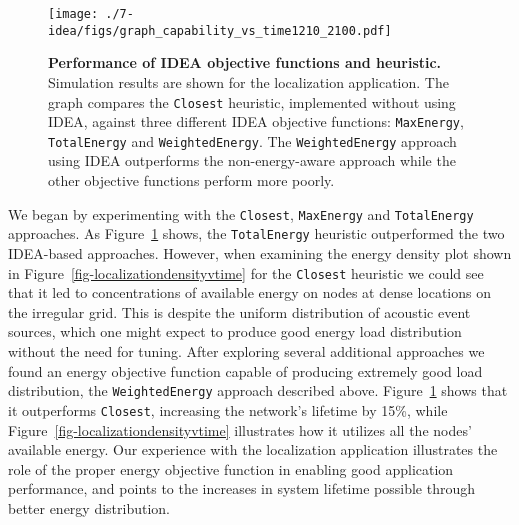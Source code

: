 \begin{figure}[t]
\begin{center}
\texttt{[image: ./7-idea/figs/graph\_capability\_vs\_time1210\_2100.pdf]}
\end{center}
\caption{\small{\textbf{Performance of IDEA objective functions and heuristic.}
Simulation results are shown for the localization application. The graph compares the \texttt{Closest} heuristic, implemented without using
IDEA, against three different IDEA objective functions: \texttt{MaxEnergy},
\texttt{TotalEnergy} and \texttt{WeightedEnergy}. The \texttt{WeightedEnergy}
approach using IDEA outperforms the non-energy-aware approach while the other
objective functions perform more poorly.}}
\label{fig-ideavsheuristics}
\end{figure}

We began by experimenting with the \texttt{Closest}, \texttt{MaxEnergy} and
\texttt{TotalEnergy} approaches. As Figure~\ref{fig-ideavsheuristics} shows,
the \texttt{TotalEnergy} heuristic outperformed the two IDEA-based
approaches.  However, when examining the energy density plot shown in
Figure~\ref{fig-localizationdensityvtime} for the \texttt{Closest} heuristic
we could see that it led to concentrations of available energy on nodes at
dense locations on the irregular grid. This is despite the uniform
distribution of acoustic event sources, which one might expect to produce
good energy load distribution without the need for tuning. After exploring
several additional approaches we found an energy objective function capable
of producing extremely good load distribution, the \texttt{WeightedEnergy}
approach described above. Figure~\ref{fig-ideavsheuristics} shows that it
outperforms \texttt{Closest}, increasing the network's lifetime by 15\%,
while Figure~\ref{fig-localizationdensityvtime} illustrates how it utilizes
all the nodes' available energy.  Our experience with the localization
application illustrates the role of the proper energy objective function in
enabling good application performance, and points to the increases in
system lifetime possible through better energy distribution. 

